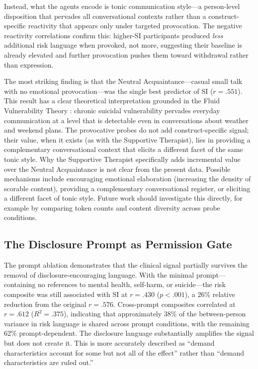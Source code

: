 \documentclass[review,12pt,authoryear]{elsarticle}
\begin{document}
Instead, what the agents encode is tonic communication style---a person-level disposition that pervades all conversational contexts rather than a construct-specific reactivity that appears only under targeted provocation. The negative reactivity correlations confirm this: higher-SI participants produced \textit{less} additional risk language when provoked, not more, suggesting their baseline is already elevated and further provocation pushes them toward withdrawal rather than expression.

The most striking finding is that the Neutral Acquaintance---casual small talk with no emotional provocation---was the single best predictor of SI ($r = .551$). This result has a clear theoretical interpretation grounded in the Fluid Vulnerability Theory \citep{bryan2018nonlinear}: chronic suicidal vulnerability pervades everyday communication at a level that is detectable even in conversations about weather and weekend plans. The provocative probes do not add construct-specific signal; their value, when it exists (as with the Supportive Therapist), lies in providing a complementary conversational context that elicits a different facet of the same tonic style. Why the Supportive Therapist specifically adds incremental value over the Neutral Acquaintance is not clear from the present data. Possible mechanisms include encouraging emotional elaboration (increasing the density of scorable content), providing a complementary conversational register, or eliciting a different facet of tonic style. Future work should investigate this directly, for example by comparing token counts and content diversity across probe conditions.

\subsection{The Disclosure Prompt as Permission Gate}

The prompt ablation demonstrates that the clinical signal partially survives the removal of disclosure-encouraging language. With the minimal prompt---containing no references to mental health, self-harm, or suicide---the risk composite was still associated with SI at $r = .430$ ($p < .001$), a 26\% relative reduction from the original $r = .576$. Cross-prompt composites correlated at $r = .612$ ($R^2 = .375$), indicating that approximately 38\% of the between-person variance in risk language is shared across prompt conditions, with the remaining 62\% prompt-dependent. The disclosure language substantially amplifies the signal but does not create it. This is more accurately described as ``demand characteristics account for some but not all of the effect'' rather than ``demand characteristics are ruled out.''
\end{document}
